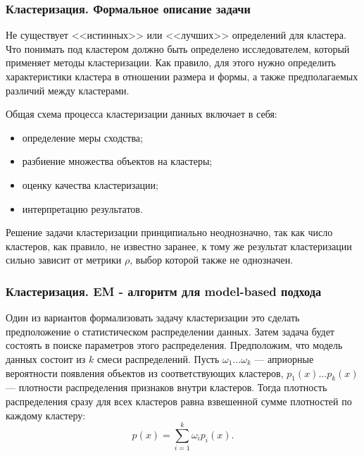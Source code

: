 \documentclass[ucs, notheorems, handout]{beamer}
\begin{document}
	\begin{frame}
	\frametitle{Кластеризация. Формальное описание задачи}
		Не существует <<истинных>> или <<лучших>> определений для кластера. Что понимать под кластером должно быть определено исследователем, который применяет методы кластеризации. Как правило, для этого нужно определить характеристики кластера в отношении размера и формы, а также предполагаемых различий между кластерами.

		Общая схема процесса кластеризации данных включает в себя: 
		\begin{itemize}
			\item определение меры сходства;
			\item разбиение множества объектов на кластеры;
			\item оценку качества кластеризации;
			\item интерпретацию результатов.
		\end{itemize}
	
		Решение задачи кластеризации принципиально неоднозначно, так как число кластеров, как правило, не известно заранее, к тому же результат кластеризации сильно зависит от метрики $\rho$, выбор которой также не однозначен.
 
	\end{frame}
	
	\begin{frame}
	\frametitle{Кластеризация. EM - алгоритм для model-based подхода}
		Один из вариантов формализовать задачу кластеризации это сделать предположение о статистическом распределении данных. Затем задача будет состоять в поиске параметров этого распределения. Предположим, что модель данных состоит из $k$ смеси распределений. Пусть $\omega_{1}\ldots \omega_{k}$ --- априорные вероятности появления объектов из соответствующих кластеров, $p_{1}(x)\ldots p_{k}(x)$ --- плотности распределения признаков внутри кластеров. Тогда плотность распределения сразу для всех кластеров равна взвешенной сумме плотностей по каждому кластеру:
		$$
		p(x) = \sum\limits_{i=1}^k \omega_{i} p_{i}(x).
		$$
 
	\end{frame}
	
\end{document}
